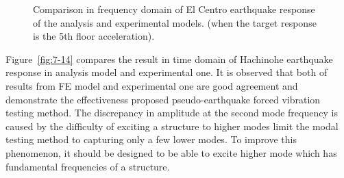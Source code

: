 \begin{figure}[!ht]
{   \label{fig:7-13e}\hfill
}
\caption{Comparison in frequency domain of El Centro earthquake response of the analysis and experimental models. (when the target response is the 5th floor acceleration).}
\label{fig:7-13}
\end{figure}

Figure~\ref{fig:7-14} compares the result in time domain of Hachinohe earthquake response in analysis model and experimental one. It is observed that both of results from FE model and experimental one are good agreement and demonstrate the effectiveness proposed pseudo-earthquake forced vibration testing method. The discrepancy in amplitude at the second mode frequency is caused by the difficulty of exciting a structure to higher modes limit the modal testing method to capturing only a few lower modes. To improve this phenomenon, it should be designed to be able to excite higher mode which has fundamental frequencies of a structure.

